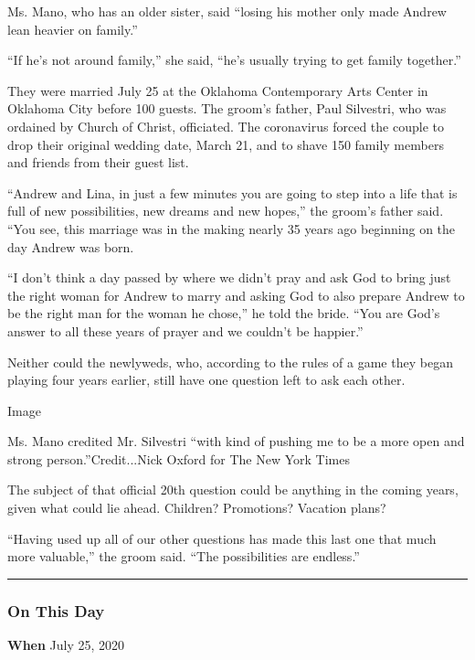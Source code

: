 Ms. Mano, who has an older sister, said ``losing his mother only made
Andrew lean heavier on family.''

``If he's not around family,'' she said, ``he's usually trying to get
family together.''

They were married July 25 at the Oklahoma Contemporary Arts Center in
Oklahoma City before 100 guests. The groom's father, Paul Silvestri, who
was ordained by Church of Christ, officiated. The coronavirus forced the
couple to drop their original wedding date, March 21, and to shave 150
family members and friends from their guest list.

``Andrew and Lina, in just a few minutes you are going to step into a
life that is full of new possibilities, new dreams and new hopes,'' the
groom's father said. ``You see, this marriage was in the making nearly
35 years ago beginning on the day Andrew was born.

``I don't think a day passed by where we didn't pray and ask God to
bring just the right woman for Andrew to marry and asking God to also
prepare Andrew to be the right man for the woman he chose,'' he told the
bride. ``You are God's answer to all these years of prayer and we
couldn't be happier.''

Neither could the newlyweds, who, according to the rules of a game they
began playing four years earlier, still have one question left to ask
each other.

Image

Ms. Mano credited Mr. Silvestri ``with kind of pushing me to be a more
open and strong person.''Credit...Nick Oxford for The New York Times

The subject of that official 20th question could be anything in the
coming years, given what could lie ahead. Children? Promotions? Vacation
plans?

``Having used up all of our other questions has made this last one that
much more valuable,'' the groom said. ``The possibilities are endless.''

\begin{center}\rule{0.5\linewidth}{\linethickness}\end{center}

\hypertarget{on-this-day}{%
\subsubsection{On This Day}\label{on-this-day}}

\textbf{When} July 25, 2020

